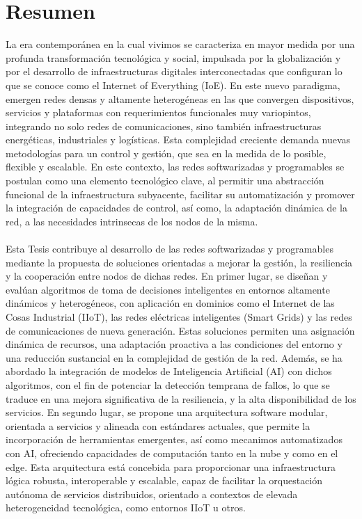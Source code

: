 \clearemptydoublepage %



\chapter{Resumen}

La era contemporánea en la cual vivimos se caracteriza en mayor medida por una profunda transformación tecnológica y social, impulsada por la globalización y por el desarrollo de infraestructuras digitales interconectadas que configuran lo que se conoce como el Internet of Everything (IoE). En este nuevo paradigma, emergen redes densas y altamente heterogéneas en las que convergen dispositivos, servicios y plataformas con requerimientos funcionales muy variopintos, integrando no solo redes de comunicaciones, sino también infraestructuras energéticas, industriales y logísticas. Esta complejidad creciente demanda nuevas metodologías para un control y gestión, que sea en la medida de lo posible, flexible y escalable. En este contexto, las redes softwarizadas y programables se postulan como una elemento tecnológico clave, al permitir una abstracción funcional de la infraestructura subyacente, facilitar su automatización y promover la integración de capacidades de control, así como, la adaptación dinámica de la red, a las necesidades intrinsecas de los nodos de la misma.\\
\\
Esta Tesis contribuye al desarrollo de las redes softwarizadas y programables mediante la propuesta de soluciones orientadas a mejorar la gestión, la resiliencia y la cooperación entre nodos de dichas redes. En primer lugar, se diseñan y evalúan algoritmos de toma de decisiones inteligentes en entornos altamente dinámicos y heterogéneos, con aplicación en dominios como el Internet de las Cosas Industrial (IIoT), las redes eléctricas inteligentes (Smart Grids) y las redes de comunicaciones de nueva generación. Estas soluciones permiten una asignación dinámica de recursos, una adaptación proactiva a las condiciones del entorno y una reducción sustancial en la complejidad de gestión de la red. Además, se ha abordado la integración de modelos de Inteligencia Artificial (AI) con dichos algoritmos, con el fin de potenciar la detección temprana de fallos, lo que se traduce en una mejora significativa de la resiliencia, y la alta disponibilidad de los servicios. En segundo lugar, se propone una arquitectura software modular, orientada a servicios y alineada con estándares actuales, que permite la incorporación de herramientas emergentes, así como mecanimos automatizados con AI, ofreciendo capacidades  de computación tanto en la nube y como en el edge. Esta arquitectura está concebida para proporcionar una infraestructura lógica robusta, interoperable y escalable, capaz de facilitar la orquestación autónoma de servicios distribuidos, orientado a contextos de elevada heterogeneidad tecnológica, como entornos IIoT u otros.


